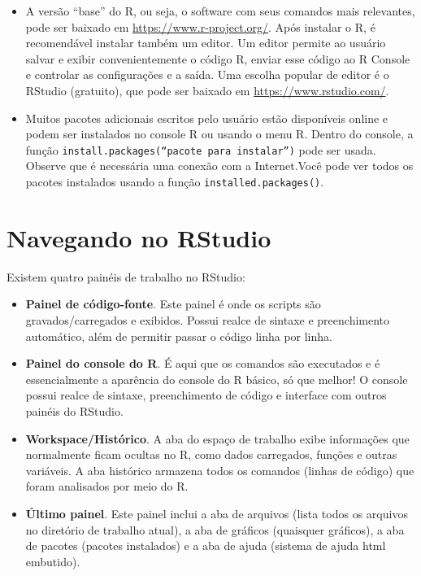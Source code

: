 \documentclass[
]{book}
\begin{document}
\begin{itemize}
\item
  A versão ``base'' do R, ou seja, o software com seus comandos mais relevantes, pode ser baixado em \url{https://www.r-project.org/}. Após instalar o R, é recomendável instalar também um editor. Um editor permite ao usuário salvar e exibir convenientemente o código R, enviar esse código ao R Console e controlar as configurações e a saída. Uma escolha popular de editor é o RStudio (gratuito), que pode ser baixado em \url{https://www.rstudio.com/}.
\item
  Muitos pacotes adicionais escritos pelo usuário estão disponíveis online e podem ser instalados no console R ou usando o menu R. Dentro do console, a função \texttt{install.packages(“pacote\ para\ instalar”)} pode ser usada. Observe que é necessária uma conexão com a Internet.Você pode ver todos os pacotes instalados usando a função \texttt{installed.packages()}.
\end{itemize}

\section{Navegando no RStudio}\label{navegando-no-rstudio}

Existem quatro painéis de trabalho no RStudio:

\begin{itemize}
\item
  \textbf{Painel de código-fonte}. Este painel é onde os scripts são gravados/carregados e exibidos. Possui realce de sintaxe e preenchimento automático, além de permitir passar o código linha por linha.
\item
  \textbf{Painel do console do R}. É aqui que os comandos são executados e é essencialmente a aparência do console do R básico, só que melhor! O console possui realce de sintaxe, preenchimento de código e interface com outros painéis do RStudio.
\item
  \textbf{Workspace/Histórico}. A aba do espaço de trabalho exibe informações que normalmente ficam ocultas no R, como dados carregados, funções e outras variáveis. A aba histórico armazena todos os comandos (linhas de código) que foram analisados por meio do R.
\item
  \textbf{Último painel}. Este painel inclui a aba de arquivos (lista todos os arquivos no diretório de trabalho atual), a aba de gráficos (quaisquer gráficos), a aba de pacotes (pacotes instalados) e a aba de ajuda (sistema de ajuda html embutido).
\end{itemize}
\end{document}
